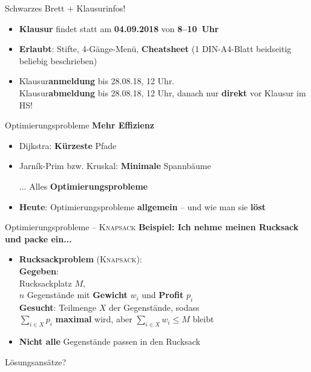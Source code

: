 



\newcommand{\Knapsack}{\textsc{Knapsack}\xspace}


	
	
\begin{frame}{Schwarzes Brett + Klausurinfos!}
	\begin{itemize}
		\item \textbf{Klausur} findet statt am \textbf{04.09.2018} von \textbf{8–10~Uhr} \\
		\item \textbf{Erlaubt}: Stifte, 4-Gänge-Menü, \textbf{Cheatsheet} (1 DIN-A4-Blatt beidseitig beliebig beschrieben) 
		\item Klausur\textbf{anmeldung} bis 28.08.18, 12 Uhr. \\
		Klausur\textbf{abmeldung} bis 28.08.18, 12 Uhr, danach nur \textbf{direkt} vor Klausur im HS!
	\end{itemize}
\end{frame}
	
	
\begin{frame}{Optimierungsprobleme}
	\textbf{Mehr Effizienz} 
	\begin{itemize}
		\item Dijkstra: \textbf{Kürzeste} Pfade
		\item Jarník-Prim bzw. Kruskal: \textbf{Minimale} Spannbäume
		\item[...]
		\implitem Alles \textbf{Optimierungsprobleme}
		\pause
		\item \textbf{Heute}: Optimierungsprobleme \textbf{allgemein} – und wie man sie \textbf{löst} \\
	\end{itemize}
\end{frame}

\begin{frame}{Optimierungsprobleme – \Knapsack}
	\textbf{Beispiel: Ich nehme meinen Rucksack und packe ein...} 
	\begin{itemize}
		\item \textbf{Rucksackproblem} (\Knapsack): \\
		\textbf{Gegeben}: \\ 
		\quad Rucksackplatz $M$, \\
		\quad $n$ Gegenstände mit \textbf{Gewicht} $w_i$ und \textbf{Profit} $p_i$ \\
		\textbf{Gesucht}: Teilmenge $X$ der Gegenstände, sodass \\
		\quad $\sum\limits_{i \in X} p_i$ \textbf{maximal} wird, aber $\sum\limits_{i \in X} w_i \leq M$ bleibt
		\item \textbf{Nicht alle} Gegenstände passen in den Rucksack
	\end{itemize}
	\forcenewline
	\pause
	Lösungsansätze?
\end{frame}


